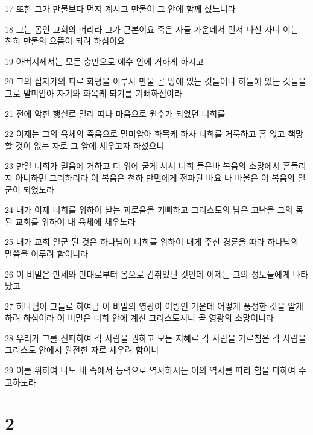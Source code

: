\par 17 또한 그가 만물보다 먼저 계시고 만물이 그 안에 함께 섰느니라
\par 18 그는 몸인 교회의 머리라 그가 근본이요 죽은 자들 가운데서 먼저 나신 자니 이는 친히 만물의 으뜸이 되려 하심이요
\par 19 아버지께서는 모든 충만으로 예수 안에 거하게 하시고
\par 20 그의 십자가의 피로 화평을 이루사 만물 곧 땅에 있는 것들이나 하늘에 있는 것들을 그로 말미암아 자기와 화목케 되기를 기뻐하심이라
\par 21 전에 악한 행실로 멀리 떠나 마음으로 원수가 되었던 너희를
\par 22 이제는 그의 육체의 죽음으로 말미암아 화목케 하사 너희를 거룩하고 흠 없고 책망할 것이 없는 자로 그 앞에 세우고자 하셨으니
\par 23 만일 너희가 믿음에 거하고 터 위에 굳게 서서 너희 들은바 복음의 소망에서 흔들리지 아니하면 그리하리라 이 복음은 천하 만민에게 전파된 바요 나 바울은 이 복음의 일군이 되었노라
\par 24 내가 이제 너희를 위하여 받는 괴로움을 기뻐하고 그리스도의 남은 고난을 그의 몸된 교회를 위하여 내 육체에 채우노라
\par 25 내가 교회 일군 된 것은 하나님이 너희를 위하여 내게 주신 경륜을 따라 하나님의 말씀을 이루려 함이니라
\par 26 이 비밀은 만세와 만대로부터 옴으로 감취었던 것인데 이제는 그의 성도들에게 나타났고
\par 27 하나님이 그들로 하여금 이 비밀의 영광이 이방인 가운데 어떻게 풍성한 것을 알게 하려 하심이라 이 비밀은 너희 안에 계신 그리스도시니 곧 영광의 소망이니라
\par 28 우리가 그를 전파하여 각 사람을 권하고 모든 지혜로 각 사람을 가르침은 각 사람을 그리스도 안에서 완전한 자로 세우려 함이니
\par 29 이를 위하여 나도 내 속에서 능력으로 역사하시는 이의 역사를 따라 힘을 다하여 수고하노라

\chapter{2}

